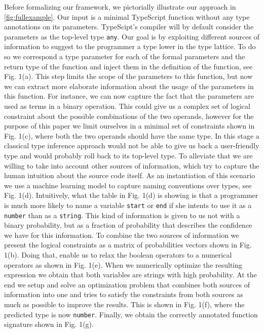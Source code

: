 \documentclass[sigplan,10pt,review,anonymous]{acmart}
\theoremstyle{plain}
\theoremstyle{remark}
\theoremstyle{definition}
\begin{document}
Before formalizing our framework, we pictorially illustrate our approach in \cref{fig:fullexample}.
Our input is a minimal TypeScript function without any type annotations 
on its parameters. TypeScipt's compiler will by default consider the
parameters as the top-level type \texttt{any}. Our goal is by exploiting different sources of information to suggest to the programmer a type
lower in the type lattice. To do so we correspond a 
type parameter for each of the formal parameters and the return type of the function and inject them in the definition of the function, see Fig. 1(a). This step limits the scope of the parameters to this function, but
now we can extract more elaborate information about the usage of the 
parameters in this function. For instance, we can now capture the 
fact that the parameters are used as terms in a binary operation. This
could give us a complex set of logical constraint about the possible combinations of the two operands, however for the purpose of this
paper we limit ourselves in a minimal set of constraints shown in Fig. 1(c), where both the two operands should have the same type. In this stage a classical type inference approach would not be able to give us back a user-friendly type and would probably roll back to its top-level type. To alleviate that we are willing to take into account other sources of 
information, which try to capture the human intuition about the source code itself. As an instantiation of this scenario we use a machine learning model to capture naming conventions over types, see Fig. 1(d).
Intuitively, what the table in Fig. 1(d) is showing is that a programmer
is much more likely to name a variable \texttt{start} or \texttt{end} 
if she intents to use it as a \texttt{number} than as a \texttt{string}.
This kind of information is given to us not with a binary probability, 
but as a fraction of probability that describes the confidence we have for this information. To combine the two sources of information we present the logical constraints as a matrix of probabilities vectors shown in Fig. 1(b). Doing that, enable us to relax the boolean operators to a numerical
operators as shown in Fig. 1(e). When we numerically optimize the resulting expression we obtain that both variables are strings with high probability.
At the end we setup and solve an optimization problem that combines both sources of information into one and tries to satisfy the constraints from both sources as much as possible to improve the results.
This is shown in Fig. 1(f), where the predicted type is now \texttt{number}.
Finally, we obtain the correctly annotated function signature shown in Fig. 1(g).
\end{document}
